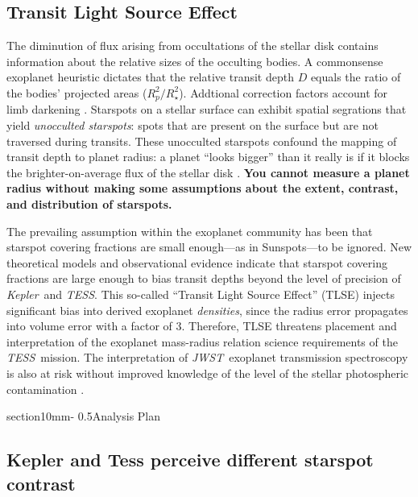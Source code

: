 \documentclass[letterpaper,11pt]{article}
\makeatletter
\renewcommand{\section}{\@startsection%
{section}{1}{0mm}{-\baselineskip}%
{0.5\baselineskip}{\normalfont\Large\bfseries}}%
\newcommand{\tess}{{\it TESS}}
\newcommand{\jwst}{{\it JWST}}
\newcommand{\kepler}{{\it Kepler}}
\makeatother
\begin{document}
\subsection{Transit Light Source Effect}
The diminution of flux arising from occultations of the stellar disk contains information about the relative sizes of the occulting bodies.  A commonsense exoplanet heuristic dictates that the relative transit depth $D$ equals the ratio of the bodies' projected areas ($R_p^2/R_\star^2$).  Addtional correction factors account for limb darkening \citep{2002ApJ...580L.171M}.  Starspots on a stellar surface can exhibit spatial segrations %
that yield \emph{unocculted starspots}: spots that are present on the surface but are not traversed during transits.  These unocculted starspots confound the mapping of transit depth to planet radius: a planet ``looks bigger'' than it really is if it blocks the brighter-on-average flux of the stellar disk \citep{2018AJ....156...91M}.  \textbf{You cannot measure a planet radius without making some assumptions about the extent, contrast, and distribution of starspots.}

The prevailing assumption within the exoplanet community has been that starspot covering fractions are small enough---as in Sunspots---to be ignored.  New theoretical models \citep{2018ApJ...853..122R} and observational evidence \citep{2016MNRAS.463.2494F} indicate that starspot covering fractions are large enough to bias transit depths beyond the level of precision of \kepler\ and \tess.  This so-called ``Transit Light Source Effect'' (TLSE) injects significant bias into derived exoplanet \emph{densities}, since the radius error propagates into volume error with a factor of 3.  Therefore, TLSE threatens placement and interpretation of the exoplanet mass-radius relation science requirements of the \tess\ mission.  The interpretation of \jwst\ exoplanet transmission spectroscopy is also at risk without improved knowledge of the level of the stellar photospheric contamination \citep{2019AJ....157...11W}.

\section{Analysis Plan}

\subsection{Kepler and Tess perceive different starspot contrast}
\end{document}
